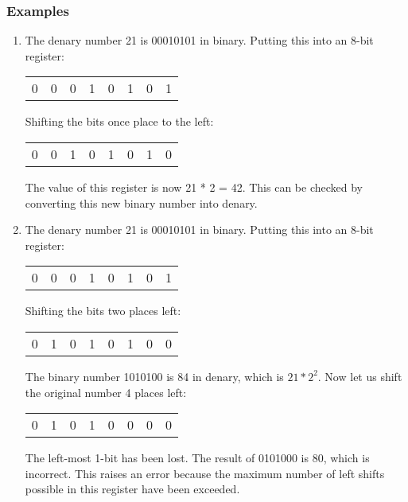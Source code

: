 \documentclass[11pt]{article}
\begin{document}
\subsubsection{Examples}
\label{sec:org660ad97}
\begin{enumerate}
\item The denary number 21 is 00010101 in binary. Putting this into an 8-bit register:
\begin{center}
\begin{tabular}{rrrrrrrr}
0 & 0 & 0 & 1 & 0 & 1 & 0 & 1\\
\end{tabular}
\end{center}
Shifting the bits once place to the left:
\begin{center}
\begin{tabular}{rrrrrrrr}
0 & 0 & 1 & 0 & 1 & 0 & 1 & 0\\
\end{tabular}
\end{center}
The value of this register is now 21 * 2 = 42. This can be checked by converting this new binary number into denary.
\item The denary number 21 is 00010101 in binary. Putting this into an 8-bit register:
\begin{center}
\begin{tabular}{rrrrrrrr}
0 & 0 & 0 & 1 & 0 & 1 & 0 & 1\\
\end{tabular}
\end{center}
Shifting the bits two places left:
\begin{center}
\begin{tabular}{rrrrrrrr}
0 & 1 & 0 & 1 & 0 & 1 & 0 & 0\\
\end{tabular}
\end{center}
The binary number 1010100 is 84 in denary, which is \(21 * 2^2\).
Now let us shift the original number 4 places left:
\begin{center}
\begin{tabular}{rrrrrrrr}
0 & 1 & 0 & 1 & 0 & 0 & 0 & 0\\
\end{tabular}
\end{center}
The left-most 1-bit has been lost. The result of 0101000 is 80, which is incorrect. This raises an error because the maximum number of left shifts possible in this register have been exceeded.
\end{enumerate}
\end{document}
